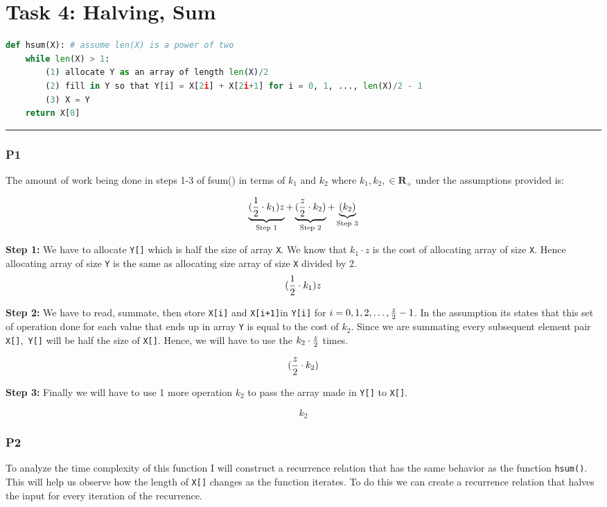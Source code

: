 \chapter{Task 4: Halving, Sum}

\begin{lstlisting}[language=Python]
def hsum(X): # assume len(X) is a power of two
    while len(X) > 1:
        (1) allocate Y as an array of length len(X)/2
        (2) fill in Y so that Y[i] = X[2i] + X[2i+1] for i = 0, 1, ..., len(X)/2 - 1
        (3) X = Y
    return X[0]
\end{lstlisting}

\vspace*{8pt}
\hrule

\subsection*{P1}
The amount of work being done in steps 1-3 of fsum() in terms of $k_1$ and $k_2$ where $k_1,k_2, \in \mathbf{R_+}$ under the assumptions provided is:

\[
  \underbrace{({1 \over 2}\cdot k_1)z}_{\text{Step 1}} + \underbrace{({z \over 2} \cdot k_2)}_{\text{Step 2}} +\underbrace{(k_2)}_{\text{Step 3}}
\]

\textbf{Step 1:}
We have to allocate \texttt{Y[]} which is half the size of array \texttt{X}. We know that $k_1 \cdot z$ is the cost of allocating array of size \texttt{X}. Hence allocating array of size \texttt{Y} is the same as allocating size array of size \texttt{X} divided by 2.
\[
 ({1 \over 2}\cdot k_1)z
\]

\textbf{Step 2:}
We have to read, summate, then store \texttt{X[i]} and \texttt{X[i+1]}in \texttt{Y[i]} for $i = 0, 1, 2, \ldots, {z\over 2} - 1$. In the assumption its states that this set of operation done for each value that ends up in array \texttt{Y} is equal to the cost of $k_2$. Since we are summating every subsequent element pair \texttt{X[]},\texttt{ Y[]} will be half the size of \texttt{X[]}. Hence, we will have to use the $k_2\cdot{z\over2}$ times. 

\[
 ({z \over 2} \cdot k_2)
\]

\textbf{Step 3:}
Finally we will have to use 1 more operation $k_2$ to pass the array made in \texttt{Y[]} to \texttt{X[]}.


\[
 k_2
\]

\pagebreak
\subsection*{P2}
To analyze the time complexity of this function I will construct a recurrence relation that has the same behavior as the function \texttt{hsum()}. This will help us observe how the length of \texttt{X[]} changes as the function iterates. To do this we can create a recurrence relation that halves the input for every iteration of the recurrence. 


